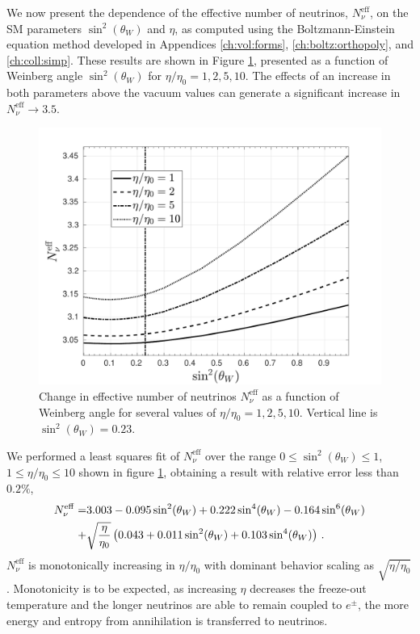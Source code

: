 We now present the dependence of the effective number of neutrinos, $N_\nu^{\mathrm{eff}}$, on the SM parameters $\sin^2(\theta_W)$ and $\eta$, as computed using the Boltzmann-Einstein equation method developed in Appendices \ref{ch:vol:forms}, \ref{ch:boltz:orthopoly}, and \ref{ch:coll:simp}. These results are shown in Figure \ref{NnuParams}, presented as a function of Weinberg angle $\sin^2(\theta_W) $ for $\eta/\eta_0=1,2,5,10$. The effects of an increase in both parameters above the vacuum values can generate a significant increase in $N_\nu^{\mathrm{eff}}\to 3.5$.
\begin{figure}
\centerline{\includegraphics[width=0.90\linewidth]{plots/N_eff2.pdf}}
\caption{Change in effective number of neutrinos $N_\nu^{\mathrm{eff}}$ as a function of Weinberg angle for several values of $\eta/\eta_0=1,2,5,10$. Vertical line is $\sin^2(\theta_W)=0.23$. }
\label{NnuParams} 
 \end{figure}

We performed a least squares fit of $N_\nu^{\mathrm{eff}}$ over the range $0\leq \sin^2(\theta_W)\leq 1$, $1\leq \eta/\eta_0\leq 10$ shown in figure \ref{NnuParams}, obtaining a result with relative error less than $0.2\%$,
\begin{align}
N_\nu^{\mathrm{eff}}=&3.003-0.095\sin^2(\theta_W) +0.222\sin^4(\theta_W ) -0.164\sin^6(\theta_W )\notag\\
+&\sqrt{\frac{\eta}{\eta_0}}\left(0.043+0.011\sin^2(\theta_W) +0.103\sin^4(\theta_W)\right)\,.
\end{align}
$N_\nu^{\mathrm{eff}}$ is monotonically increasing in $\eta/\eta_0$ with dominant behavior scaling as $\sqrt{ \eta/\eta_0}$. Monotonicity is to be expected, as increasing $\eta$ decreases the freeze-out temperature and the longer neutrinos are able to remain coupled to $e^\pm$, the more energy and entropy from annihilation is transferred to neutrinos.


